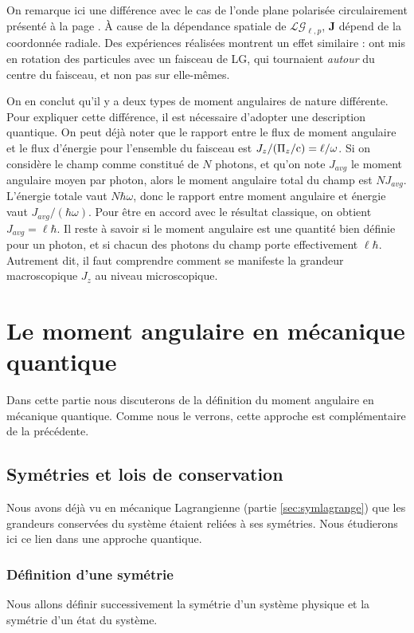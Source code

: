 On remarque ici une différence avec le cas de l'onde plane polarisée circulairement présenté à la page \pageref{sec:ma_circ}. \`{A} cause de la dépendance spatiale de $\mathcal{LG}_{\ell,p}$, $\bm{J}$ dépend de la coordonnée radiale. Des expériences réalisées montrent un effet similaire :  ont mis en rotation des particules avec un faisceau de LG, qui tournaient \textit{autour} du centre du faisceau, et non pas sur elle-mêmes. 

On en conclut qu'il y a deux types de moment angulaires de nature différente. Pour expliquer cette différence, il est nécessaire d'adopter une description quantique. 
On peut déjà noter que le rapport entre le flux de moment angulaire et le flux d'énergie pour l'ensemble du faisceau est $J_z/(\Pi_z/\mathrm{c}) = \ell/\omega$. Si on considère le champ comme constitué de $N$ photons, et qu'on note $J_{avg}$ le moment angulaire moyen par photon, alors le moment angulaire total du champ est $NJ_{avg}$. L'énergie totale vaut $N\hbar\omega$, donc le rapport entre moment angulaire et énergie vaut $J_{avg}/(\hbar\omega)$. Pour être en accord avec le résultat classique, on obtient $J_{avg} = \ell\hbar$. Il reste à savoir si le moment angulaire est une quantité bien définie pour un photon, et si chacun des photons du champ porte effectivement $\ell\hbar$. Autrement dit, il faut comprendre comment se manifeste la grandeur macroscopique $J_z$ au niveau microscopique. 



\chapter{Le moment angulaire en mécanique quantique}
Dans cette partie nous discuterons de la définition du moment angulaire en mécanique quantique. Comme nous le verrons, cette approche est complémentaire de la précédente.

\section{Symétries et lois de conservation}
\label{symqm}
Nous avons déjà vu en mécanique Lagrangienne (partie \ref{sec:symlagrange}) que les grandeurs conservées du système étaient reliées à ses symétries. Nous étudierons ici ce lien dans une approche quantique.

\subsection{Définition d'une symétrie}
Nous allons définir successivement la symétrie d'un système physique et la symétrie d'un état du système.

